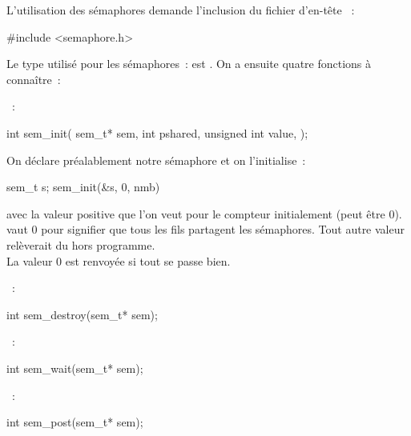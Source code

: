\begin{adjustwidth}{-3cm}{-3cm}
L'utilisation des sémaphores demande l'inclusion du fichier d'en-tête ~:
\begin{lstC}
    #include <semaphore.h>
\end{lstC}
Le type utilisé pour les sémaphores~: est . On a ensuite quatre fonctions à connaître~:
\begin{enumeratebf}
    \item {}~:
    \begin{lstC}
    int sem_init(
        sem_t* sem,
        int pshared,
        unsigned int value,
    );
    \end{lstC}
    On déclare préalablement notre sémaphore et on l'initialise~:
    \begin{lstC}
    sem_t s;
    sem_init(&s, 0, nmb)
    \end{lstC}
    avec  la valeur positive que l'on veut pour le compteur initialement (peut être 0).\\
     vaut 0 pour signifier que tous les fils partagent les sémaphores. Tout autre valeur relèverait du hors programme.\\
    La valeur 0 est renvoyée si tout se passe bien.
    \item {}~:
    \begin{lstC}
    int sem_destroy(sem_t* sem);
    \end{lstC}
    \item {}~: 
    \begin{lstC}
    int sem_wait(sem_t* sem);
    \end{lstC}
    \item {}~:
    \begin{lstC}
    int sem_post(sem_t* sem);
    \end{lstC}
\end{enumeratebf}


\end{adjustwidth}
